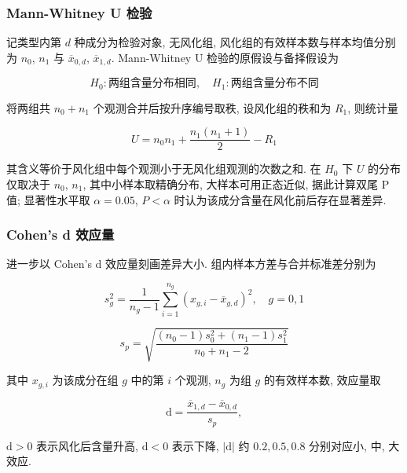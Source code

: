 \documentclass{ctexart}
\begin{document}
\subsubsection{Mann-Whitney U 检验}

记类型内第 $d$ 种成分为检验对象, 无风化组, 风化组的有效样本数与样本均值分别为 $n_{0}$, $n_{1}$ 与 $\overline{x}_{0,d}$, $\overline{x}_{1,d}$. Mann-Whitney U 检验的原假设与备择假设为

\begin{equation*}
H_{0}:\text{两组含量分布相同},\quad{}H_{1}:\text{两组含量分布不同}
\end{equation*}

将两组共 $n_{0}+n_{1}$ 个观测合并后按升序编号取秩, 设风化组的秩和为 $R_{1}$, 则统计量

\begin{equation*}
U=n_{0}n_{1}+\frac{n_{1}\left(n_{1}+1\right)}{2}-R_{1}
\end{equation*}

其含义等价于风化组中每个观测小于无风化组观测的次数之和. 在 $H_0$ 下 $U$ 的分布仅取决于 $n_{0}$, $n_{1}$, 其中小样本取精确分布, 大样本可用正态近似, 据此计算双尾 P 值; 显著性水平取 $\alpha=0.05$, $P<\alpha$ 时认为该成分含量在风化前后存在显著差异.


\subsubsection{Cohen's d 效应量}

进一步以 Cohen's d 效应量刻画差异大小. 组内样本方差与合并标准差分别为

\begin{equation*}
s_{g}^{2}=\frac{1}{n_{g}-1}\sum_{i=1}^{n_{g}}\left(x_{g,i}-\overline{x}_{g,d}\right)^{2},\quad{}g=0,1
\end{equation*}

\begin{equation*}
s_{p}=\sqrt{\frac{\left(n_{0}-1\right)s_{0}^{2}+\left(n_{1}-1\right)s_{1}^{2}}{n_{0}+n_{1}-2}}
\end{equation*}

其中 $x_{g,i}$ 为该成分在组 $g$ 中的第 $i$ 个观测, $n_g$ 为组 $g$ 的有效样本数, 效应量取

\begin{equation*}
\mathrm{d}=\frac{\overline{x}_{1,d}-\overline{x}_{0,d}}{s_{p}},
\end{equation*}

$\mathrm{d}>0$ 表示风化后含量升高, $\mathrm{d}<0$ 表示下降, $\left|\mathrm{d}\right|$ 约 $0.2,0.5,0.8$ 分别对应小, 中, 大效应.
\end{document}
